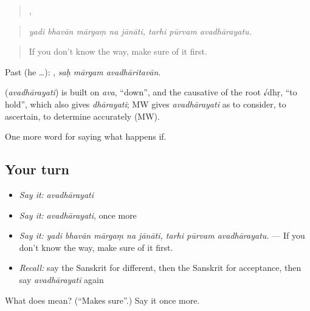 \begin{quote}
    ,   
\end{quote}

\begin{quote}
\emph{yadi bhavān mārgaṃ na jānāti, tarhi pūrvam avadhārayatu.}
\end{quote}

\begin{quote}
If you don't know the way, make sure of it first.
\end{quote}

Past (he …):   , \emph{saḥ mārgam avadhāritavān}.

\begin{cousinweb}
\textbf{} (\emph{avadhārayati}) is built on \emph{ava}, \textquotedblleft{}down\textquotedblright{}, and the causative of the root √dhṛ, \textquotedblleft{}to hold\textquotedblright{}, which also gives \emph{dhārayati}; MW gives \emph{avadhārayati} as to consider, to ascertain, to determine accurately (MW).
\end{cousinweb}

\begin{grammarlens}[title={What you've built}]
One more word for saying what happens if.
\end{grammarlens}

\subsection*{Your turn}
\begin{itemize}
\raggedright
  \item \emph{Say it:} \emph{avadhārayati}
  \item \emph{Say it:} \emph{avadhārayati}, once more
  \item \emph{Say it:} \emph{yadi bhavān mārgaṃ na jānāti, tarhi pūrvam avadhārayatu.} — If you don't know the way, make sure of it first.
  \item \emph{Recall:} say the Sanskrit for different, then the Sanskrit for acceptance, then say \emph{avadhārayati} again
\end{itemize}

\begin{tcolorbox}[breakable,colback=teal!4,colframe=teal!35!black,title={Before you move on}]
What does  mean? (\textquotedblleft{}Makes sure\textquotedblright{}.) Say it once more.
\end{tcolorbox}

